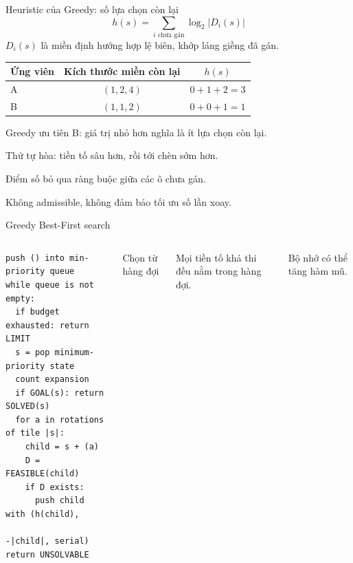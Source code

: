 \begin{frame}{Heuristic của Greedy: số lựa chọn còn lại}
\[
h(s)=\sum_{i\text{ chưa gán}}\log_2 |D_i(s)|
\]
\small $D_i(s)$ là miền định hướng hợp lệ biên, khớp láng giềng đã gán.
\vspace{5mm}
\begin{center}
\begin{tabular}{@{}lcc@{}}
\toprule
Ứng viên & Kích thước miền còn lại & $h(s)$\\\midrule
A & $(1,2,4)$ & $0+1+2=3$\\
B & $(1,1,2)$ & $0+0+1=1$\\\bottomrule
\end{tabular}
\end{center}
\vspace{3mm}
Greedy ưu tiên B: giá trị nhỏ hơn nghĩa là ít lựa chọn còn lại.\par
\small Thứ tự hòa: tiền tố sâu hơn, rồi tới chèn sớm hơn.\par\vspace{3mm}
Điểm số bỏ qua ràng buộc giữa các ô chưa gán.\par
Không admissible, không đảm bảo tối ưu số lần xoay.
\end{frame}

\begin{frame}[fragile]{Greedy Best-First search}
\begin{columns}[T,onlytextwidth]
\begin{lstlisting}
push () into min-priority queue
while queue is not empty:
  if budget exhausted: return LIMIT
  s = pop minimum-priority state
  count expansion
  if GOAL(s): return SOLVED(s)
  for a in rotations of tile |s|:
    child = s + (a)
    D = FEASIBLE(child)
    if D exists:
      push child with (h(child),
                       -|child|, serial)
return UNSOLVABLE
\end{lstlisting}
\small Chọn từ hàng đợi\par\vspace{3mm}
\par\vspace{3mm}
Mọi tiền tố khả thi đều nằm trong hàng đợi.\par\vspace{3mm}
Bộ nhớ có thể tăng hàm mũ.
\end{columns}
\end{frame}

